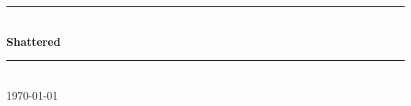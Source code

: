 \documentclass[conference,compsoc]{IEEEtran}
\begin{document}
\begin{titlepage}

\author{Seth Miers}

\vspace*{\fill}                                            %

\newcommand{\HRule}{\rule{\linewidth}{0.3mm}}              %

\center                                                    %

\HRule \\[0.4cm]
{ \huge \bfseries Shattered}\\[0.4cm]   %
\HRule \\[1.5cm]

{\large \today}\\[3cm]                                     %

\vspace*{\fill}                                            %

\end{titlepage}
\end{document}

